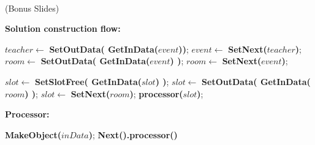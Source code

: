 \documentclass[centering]{report}
\newenvironment{slide}
    {\newpage
    \vspace*{\fill}
    }
    { 
     \vspace*{\fill}
    }
\begin{document}

\begin{frame}\\
  
  \large{}
\end{frame}

\begin{slide}
(Bonus Slides)
\end{slide}


\begin{slide}
\textbf{Solution construction flow:}\\
{\huge
  \begin{algorithmic}[1]

    \State $teacher \gets $ \textbf{SetOutData( \textbf{GetInData($event$)})};
    \State $event \gets $ \textbf{SetNext($teacher$)};
    \State $room \gets $ \textbf{SetOutData( \textbf{GetInData($event$)} )};
    \State $room \gets $ \textbf{SetNext($event$)};

    \State $slot \gets $ \textbf{SetSlotFree( \textbf{GetInData($slot$)} )};
    \State $slot \gets $ \textbf{SetOutData( \textbf{GetInData($room$)} )};
    \State $slot \gets $ \textbf{SetNext($room$)};
    \State \textbf{processor($slot$)};

    \EndProcedure
  \end{algorithmic}
}
\end{slide}


\begin{slide}
\textbf{Processor:}\\
{\huge
  \begin{algorithmic}[1]

    \State \textbf{MakeObject($inData$)};
      \State \textbf{Next().processor()}
    \EndIf
    \EndProcedure
  \end{algorithmic}
}
\end{slide}
\end{document}
